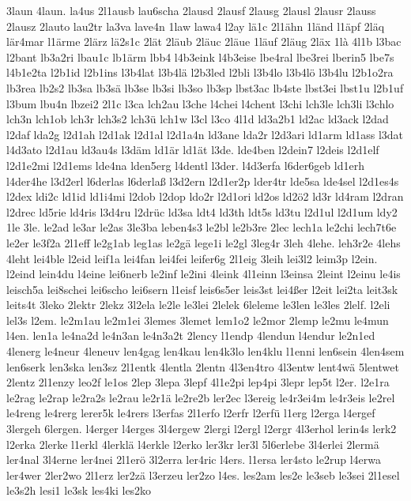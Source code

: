 {3laun
4laun.
la4us
2l1ausb
lau6scha
2lausd
2lausf
2lausg
2lausl
2lausr
2lauss
2lausz
2lauto
lau2tr
la3va
lave4n
1law
lawa4
l2ay
lä1c
2l1ähn
1länd
l1äpf
2läq
lär4mar
l1ärme
2lärz
lä2s1c
2lät
2läub
2läuc
2läue
1läuf
2läug
2läx
1là
4l1b
l3bac
l2bant
lb3a2ri
lbau1c
lb1ärm
lbb4
l4b3eink
l4b3eise
lbe4ral
lbe3rei
lberin5
lbe7s
l4b1e2ta
l2b1id
l2b1ins
l3b4lat
l3b4lä
l2b3led
l2bli
l3b4lo
l3b4lö
l3b4lu
l2b1o2ra
lb3rea
lb2s2
lb3sa
lb3sä
lb3se
lb3si
lb3so
lb3sp
lbst3ac
lb4ste
lbst3ei
lbst1u
l2b1uf
l3bum
lbu4n
lbzei2
2l1c
l3ca
lch2au
l3che
l4chei
l4chent
l3chi
lch3le
lch3li
l3chlo
lch3n
lch1ob
lch3r
lch3s2
lch3ü
lch1w
l3cl
l3co
4l1d
ld3a2b1
ld2ac
ld3ack
l2dad
l2daf
lda2g
l2d1ah
l2d1ak
l2d1al
l2d1a4n
ld3ane
lda2r
l2d3ari
ld1arm
ld1ass
l3dat
l4d3ato
l2d1au
ld3au4s
l3däm
ld1är
ld1ät
l3de.
lde4ben
l2dein7
l2deis
l2d1elf
l2d1e2mi
l2d1ems
lde4na
lden5erg
l4dentl
l3der.
l4d3erfa
l6der6geb
ld1erh
l4der4he
l3d2erl
l6derlas
l6derlaß
l3d2ern
l2d1er2p
lder4tr
lde5sa
lde4sel
l2d1es4s
l2dex
ldi2c
ld1id
ld1i4mi
l2dob
l2dop
ldo2r
l2d1ori
ld2os
ld2ö2
ld3r
ld4ram
l2dran
l2drec
ld5rie
ld4ris
l3d4ru
l2drüc
ld3sa
ldt4
ld3th
ldt5s
ld3tu
l2d1ul
l2d1um
ldy2
1le
3le.
le2ad
le3ar
le2as
3le3ba
leben4s3
le2bl
le2b3re
2lec
lech1a
le2chi
lech7t6e
le2er
le3f2a
2l1eff
le2g1ab
leg1as
le2gä
lege1i
le2gl
3leg4r
3leh
4lehe.
leh3r2e
4lehs
4leht
lei4ble
l2eid
leif1a
lei4fan
lei4fei
leifer6g
2l1eig
3leih
lei3l2
leim3p
l2ein.
l2eind
lein4du
l4eine
lei6nerb
le2inf
le2ini
4leink
4l1einn
l3einsa
2leint
l2einu
le4is
leisch5a
lei8schei
lei6scho
lei6sern
l1eisf
leis6s5er
leis3st
lei4ßer
l2eit
lei2ta
leit3sk
leits4t
3leko
2lektr
2lekz
3l2ela
le2le
le3lei
2lelek
6leleme
le3len
le3les
2lelf.
l2eli
lel3s
l2em.
le2m1au
le2m1ei
3lemes
3lemet
lem1o2
le2mor
2lemp
le2mu
le4mun
l4en.
len1a
le4na2d
le4n3an
le4n3a2t
2lency
l1endp
4lendun
l4endur
le2n1ed
4lenerg
le4neur
4leneuv
len4gag
len4kau
len4k3lo
len4klu
l1enni
len6sein
4len4sem
len6serk
len3ska
len3sz
2l1entk
4lentla
2lentn
4l3en4tro
4l3entw
lent4wä
5lentwet
2lentz
2l1enzy
leo2f
le1os
2lep
3lepa
3lepf
4l1e2pi
lep4pi
3lepr
lep5t
l2er.
l2e1ra
le2rag
le2rap
le2ra2s
le2rau
le2r1ä
le2re2b
ler2ec
l3ereig
le4r3ei4m
le4r3eis
le2rel
le4reng
le4rerg
lerer5k
le4rers
l3erfas
2l1erfo
l2erfr
l2erfü
l1erg
l2erga
l4ergef
3lergeh
6lergen.
l4erger
l4erges
3l4ergew
2lergi
l2ergl
l2ergr
4l3erhol
lerin4s
lerk2
l2erka
2lerke
l1erkl
4lerklä
l4erkle
l2erko
ler3kr
ler3l
5l6erlebe
3l4erlei
2lermä
ler4nal
3l4erne
ler4nei
2l1erö
3l2erra
ler4ric
l4ers.
l1ersa
ler4sto
le2rup
l4erwa
ler4wer
2ler2wo
2l1erz
ler2zä
l3erzeu
ler2zo
l4es.
les2am
les2e
le3seb
le3sei
2l1esel
le3s2h
lesi1
le3sk
les4ki
les2ko
}
